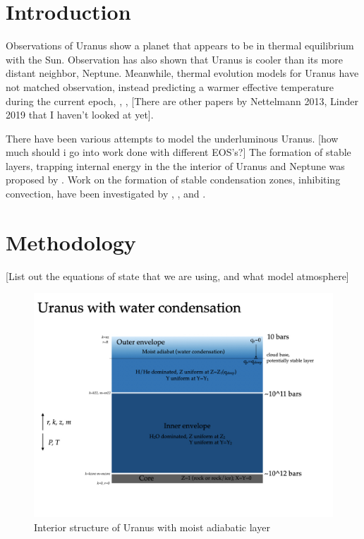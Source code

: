 \documentclass[11pt]{ucscthesisbs}
\begin{document}
\chapter{Introduction}
Observations of Uranus show a planet that appears to be in thermal equilibrium with the Sun. Observation has also shown that Uranus is cooler than its more distant neighbor, Neptune. Meanwhile, thermal evolution models for Uranus have not matched observation, instead predicting a warmer effective temperature during the current epoch\citep{fortney_2011}, \citep{podolak_1991}, \citep{hubbard_1995}, \citep{scheibe_2019} [There are other papers by Nettelmann 2013, Linder 2019 that I haven't looked at yet]. 

There have been various attempts to model the underluminous Uranus. [how much should i go into work done with different EOS's?] The formation of stable layers, trapping internal energy in the the interior of Uranus and Neptune was proposed by \citep{podolak_1991}. Work on the formation of stable condensation zones, inhibiting convection, have been investigated by \citep{friedson_2017}, \citep{leconte_2017}, and \citep{guillot_1995}. 


\chapter{Methodology}

[List out the equations of state that we are using, and what model atmosphere]



\begin{figure}[ht!]
 \centerline{
  \includegraphics[width=7.0in]{figures/uranus_with_wcz_structure.001.jpeg}
 }
\caption[Interior Structure]
{Interior structure of Uranus with moist adiabatic layer}
\label{fig:uranus}
\end{figure}
\end{document}
